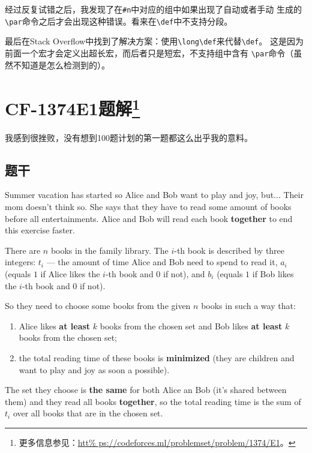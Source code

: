 经过反复试错之后，我发现了在\verb|#n|中对应的组中如果出现了自动或者手动
生成的\verb|\par|命令之后才会出现这种错误。看来在\verb|\def|中不支持分段。

最后在Stack Overflow中找到了解决方案：使用\verb|\long\def|来代替\verb|\def|。
这是因为前面一个宏才会定义出超长宏，而后者只是短宏，不支持组中含有%
\verb|\par|命令（虽然不知道是怎么检测到的）。


\section[CF-1374E1题解]{CF-1374E1题解\footnote{更多信息参见：\url{htt%
ps://codeforces.ml/problemset/problem/1374/E1}。}}

我感到很挫败，没有想到100题计划的第一题都这么出乎我的意料。

\subsection{题干}

Summer vacation has started so Alice and Bob want to play and joy, but... Their mom doesn't think so. She says that they have to read some amount of books before all entertainments. Alice and Bob will read each book {\bf together} to end this exercise faster.

There are $n$ books in the family library. The $i$-th book is described by three integers: $t_i$ — the amount of time Alice and Bob need to spend to read it, $a_i$ (equals $1$ if Alice likes the $i$-th book and $0$ if not), and $b_i$ (equals $1$ if Bob likes the $i$-th book and $0$ if not).

So they need to choose some books from the given $n$ books in such a way that:

\begin{enumerate}
    \item Alice likes {\bf at least} $k$ books from the chosen set and Bob likes {\bf at least} $k$ books from the chosen set;

    \item the total reading time of these books is {\bf minimized} (they are children and want to play and joy as soon a possible).
\end{enumerate}

The set they choose is {\bf the same} for both Alice an Bob (it's shared between them) and they read all books {\bf together}, so the total reading time is the sum of $t_i$ over all books that are in the chosen set.

